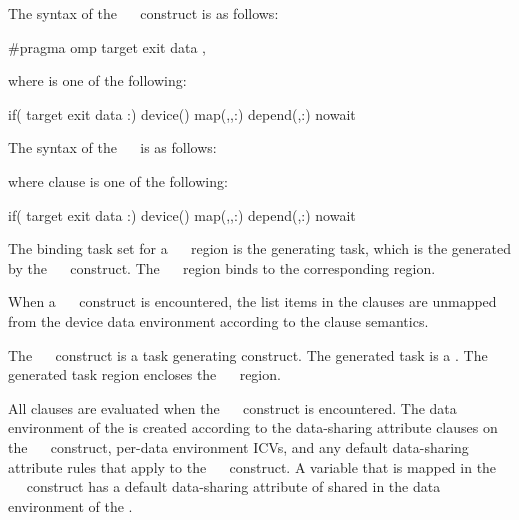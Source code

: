 \syntax
\begin{ccppspecific}
The syntax of the ~~ construct is as follows:
\begin{ompcPragma}
#pragma omp target exit data \plc{[ clause[ [},\plc{] clause]...] new-line}
\end{ompcPragma}
where  is one of the following:
\begin{indentedcodelist}
if(\plc{[} target exit data :\plc{] scalar-expression})
device()
map(\plc{[map-type-modifier[},\plc{] [map-type-modifier[},\plc{] ...] map-type}:)
depend(\plc{[depend-modifier},\plc{] dependence-type }:)
nowait
\end{indentedcodelist}
\end{ccppspecific}
\begin{fortranspecific}
The syntax of the ~~ is as follows:
where clause is one of the following:
\begin{indentedcodelist}
if(\plc{[} target exit data :\plc{] scalar-logical-expression})
device()
map(\plc{[map-type-modifier[},\plc{] [map-type-modifier[},\plc{] ...] map-type}:)
depend(\plc{[depend-modifier},\plc{] dependence-type }:)
nowait
\end{indentedcodelist}
\end{fortranspecific}

\binding
The binding task set for a ~~ region is
the generating task, which is the  generated by the
~~ construct. The
~~ region binds to the corresponding
 region.

\descr
When a ~~ construct is encountered, the list 
items in the  clauses are unmapped from the device data environment 
according to the  clause semantics.

The ~~ construct is a task generating construct.  
The generated task is a .  The generated task region encloses the 
~~ region.

All clauses are evaluated when the ~~ construct 
is encountered.  The data environment of the  is created according 
to the data-sharing attribute clauses on the ~~ 
construct, per-data environment ICVs, and any default data-sharing attribute rules 
that apply to the ~~ construct.  A variable that 
is mapped in the ~~ construct has a default 
data-sharing attribute of shared in the data environment of the .

